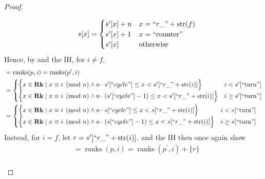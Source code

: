 \documentclass{amsart}
\DeclareMathOperator{\Rk}{\mathbf{Rk}}
\DeclareMathOperator{\ranks}{\mathrm{ranks}}
\theoremstyle{definition}
\begin{document}
\begin{proof}
\begin{enumerate}
\begin{enumerate}
\begin{align*}
                        &&
                        s[x] =
                        \begin{cases}
                            s^\prime[x] + n & x = ``r\_" + \mathrm{str}(f)\\
                            s^\prime[x] + 1 & x = ``\text{counter}"\\
                            s^\prime[x] & \text{otherwise}
                        \end{cases}
                    \end{align*}
                    Hence, by  and the IH, for $i \neq f$,
                    \begin{align*}
                        &= \ranks(p, i) = \ranks(p^\prime, i)\\
                        &=
                            \begin{cases}
                                \Big\{x \in \Rk \mid x \equiv i \pmod n \land n \cdot s^\prime[``cycle"] \leq x < s^\prime[``r\_" + \mathrm{str}(i)] \Big\} 
                                & i < s^\prime[``\text{turn}"]\\
                                \Big\{x \in \Rk \mid x \equiv i \pmod n \land n \cdot (s^\prime[``cycle"] - 1) \leq x < s^\prime[``r\_" + \mathrm{str}(i)]\Big\} 
                                & i \geq s^\prime[``\text{turn}"]
                            \end{cases}\\
                        &=
                            \begin{cases}
                                \Big\{x \in \Rk \mid x \equiv i \pmod n \land n \cdot s[``cycle"] \leq x < s[``r\_" + \mathrm{str}(i)] \Big\} 
                                & i < s[``\text{turn}"]\\
                                \Big\{x \in \Rk \mid x \equiv i \pmod n \land n \cdot (s[``cycle"] - 1) \leq x < s[``r\_" + \mathrm{str}(i)]\Big\} 
                                & i \geq s[``\text{turn}"]
                            \end{cases}
                    \end{align*}
                    Instead, for $i = f$, let $r = s^\prime[``r\_" + \mathrm{str}(i)]$. 
                     and the IH then once again show
                    \begin{align*}
                        &= \ranks(p, i) = \ranks(p^\prime, i) + \{r\}\\

\end{align*}
\end{enumerate}
\end{enumerate}
\end{proof}
\end{document}
